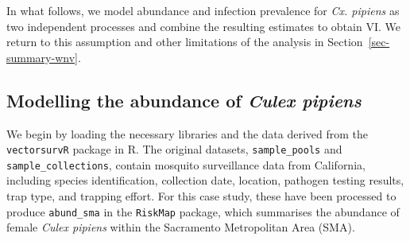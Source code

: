 \documentclass[
  letterpaper,
]{krantz}
\newenvironment{Shaded}{\begin{snugshade}}{\end{snugshade}}
\newcommand{\AttributeTok}[1]{\textcolor[rgb]{0.13,0.29,0.53}{#1}}
\newcommand{\DocumentationTok}[1]{\textcolor[rgb]{0.56,0.35,0.01}{\textbf{\textit{#1}}}}
\newcommand{\FunctionTok}[1]{\textcolor[rgb]{0.13,0.29,0.53}{\textbf{#1}}}
\newcommand{\NormalTok}[1]{#1}
\begin{document}
In what follows, we model abundance and infection prevalence for
\emph{Cx. pipiens} as two independent processes and combine the
resulting estimates to obtain VI. We return to this assumption and other
limitations of the analysis in Section~\ref{sec-summary-wnv}.

\subsection{\texorpdfstring{Modelling the abundance of \emph{Culex
pipiens}}{Modelling the abundance of Culex pipiens}}\label{sec-abund-model}

We begin by loading the necessary libraries and the data derived from
the \texttt{vectorsurvR} package in R. The original datasets,
\texttt{sample\_pools} and \texttt{sample\_collections}, contain
mosquito surveillance data from California, including species
identification, collection date, location, pathogen testing results,
trap type, and trapping effort. For this case study, these have been
processed to produce \texttt{abund\_sma} in the \texttt{RiskMap}
package, which summarises the abundance of female \emph{Culex pipiens}
within the Sacramento Metropolitan Area (SMA).

\begin{Shaded}
\end{Shaded}
\end{document}
